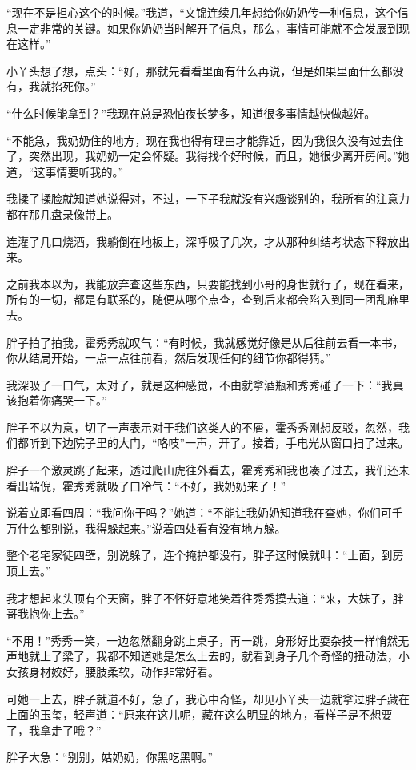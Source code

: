 “现在不是担心这个的时候。”我道，“文锦连续几年想给你奶奶传一种信息，这个信息一定非常的关键。如果你奶奶当时解开了信息，那么，事情可能就不会发展到现在这样。”

小丫头想了想，点头：“好，那就先看看里面有什么再说，但是如果里面什么都没有，我就掐死你。”

“什么时候能拿到？”我现在总是恐怕夜长梦多，知道很多事情越快做越好。

“不能急，我奶奶住的地方，现在我也得有理由才能靠近，因为我很久没有过去住了，突然出现，我奶奶一定会怀疑。我得找个好时候，而且，她很少离开房间。”她道，“这事情要听我的。”

我揉了揉脸就知道她说得对，不过，一下子我就没有兴趣谈别的，我所有的注意力都在那几盘录像带上。

连灌了几口烧酒，我躺倒在地板上，深呼吸了几次，才从那种纠结考状态下释放出来。

之前我本以为，我能放弃查这些东西，只要能找到小哥的身世就行了，现在看来，所有的一切，都是有联系的，随便从哪个点查，查到后来都会陷入到同一团乱麻里去。

胖子拍了拍我，霍秀秀就叹气：“有时候，我就感觉好像是从后往前去看一本书，你从结局开始，一点一点往前看，然后发现任何的细节你都得猜。”

我深吸了一口气，太对了，就是这种感觉，不由就拿酒瓶和秀秀碰了一下：“我真该抱着你痛哭一下。”

胖子不以为意，切了一声表示对于我们这类人的不屑，霍秀秀刚想反驳，忽然，我们都听到下边院子里的大门，“咯吱”一声，开了。接着，手电光从窗口扫了过来。

胖子一个激灵跳了起来，透过爬山虎往外看去，霍秀秀和我也凑了过去，我们还未看出端倪，霍秀秀就吸了口冷气：“不好，我奶奶来了！”

说着立即看四周：“我问你干吗？”她道：“不能让我奶奶知道我在查她，你们可千万什么都别说，我得躲起来。”说着四处看有没有地方躲。

整个老宅家徒四壁，别说躲了，连个掩护都没有，胖子这时候就叫：“上面，到房顶上去。”

我才想起来头顶有个天窗，胖子不怀好意地笑着往秀秀摸去道：“来，大妹子，胖哥我抱你上去。”

“不用！”秀秀一笑，一边忽然翻身跳上桌子，再一跳，身形好比耍杂技一样悄然无声地就上了梁了，我都不知道她是怎么上去的，就看到身子几个奇怪的扭动法，小女孩身材姣好，腰肢柔软，动作非常好看。

可她一上去，胖子就道不好，急了，我心中奇怪，却见小丫头一边就拿过胖子藏在上面的玉玺，轻声道：“原来在这儿呢，藏在这么明显的地方，看样子是不想要了，我拿走了哦？”

胖子大急：“别别，姑奶奶，你黑吃黑啊。”


